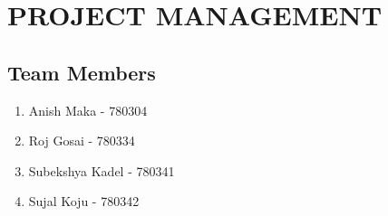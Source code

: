 \chapter{PROJECT MANAGEMENT}
\section{Team Members}
\begin{enumerate}
	\item Anish Maka      - 780304
	\item Roj Gosai       - 780334
	\item Subekshya Kadel - 780341
	\item Sujal Koju      - 780342
\end{enumerate}


